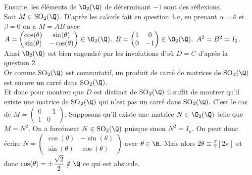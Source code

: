 \documentclass[8pt]{book}
\begin{document}
\begin{enumerate}[leftmargin=*]
\begin{enumerate}[label=\alph*.]
			Ensuite, les éléments de $\O_2(\Q)$ de déterminant $-1$ sont des réflexions.\\
			Soit $M\in \text{SO}_2(\Q)$. D'après les calculs fait en question $3.a$, en prenant $\alpha=\theta$ et $\beta=0$ on a $M=AB$ avec $A=\begin{pmatrix}\cos(\theta)&\sin(\theta)\\\sin(\theta)&-\cos(\theta)
			\end{pmatrix}\in \O_2(\Q),\ B=\begin{pmatrix}1&0\\0&-1
			\end{pmatrix}\in \O_2(\Q),\ A^2=B^2=I_2$.\\
			Ainsi $\O_2(\Q)$ est bien engendré par les involutions d'où $D=C$ d'après la question $2$.\\
			Or comme SO$_2(\Q)$ est commutatif, un produit de carré de matrices de SO$_2(\Q)$ est encore un carré dans SO$_2(\Q)$.\\
			Et donc pour montrer que $D$ est distinct de SO$_2(\Q)$ il suffit de montrer qu'il existe une matrice de SO$_2(\Q)$ qui n'est pas un carré dans SO$_2(\Q)$. C'est le cas de $M=\begin{pmatrix}0&-1\\1&0\end{pmatrix}$. Supposons qu'il existe une matrice $N\in \O_2(\Q)$ telle que $M=N^2$. On a forcément $N\in \text{SO}_2(\Q)$ puisque sinon $N^2=I_n$. On peut donc écrire $N=\begin{pmatrix}\cos(\theta)&-\sin(\theta)\\\sin(\theta)&\cos(\theta)\end{pmatrix}$ avec $\theta\in \R$. Mais alors $2\theta\equiv \displaystyle\frac{\pi}{2}[2\pi]$ et donc $\cos(\theta)=\pm\displaystyle\frac{\sqrt{2}}{2}\notin \Q$ ce qui est absurde.
		\end{enumerate}
	\end{enumerate}
	
\end{document}
